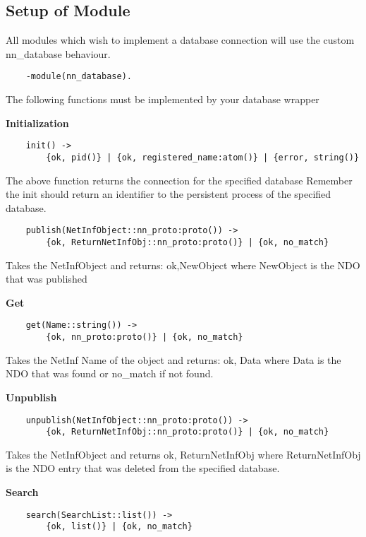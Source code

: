 \documentclass[11pt]{report}
\begin{document}
\subsection {Setup of Module}

All modules which wish to implement a database connection will use the custom nn\_database behaviour.

\begin {verbatim}
    -module(nn_database).
\end{verbatim}

The following functions must be implemented by your database wrapper

\textbf{Initialization}

\begin {verbatim}
    init() -> 
    	{ok, pid()} | {ok, registered_name:atom()} | {error, string()}
\end{verbatim}

The above function returns the connection for the specified database
Remember the init should return an identifier to the persistent process of the specified database.

\begin {verbatim}
    publish(NetInfObject::nn_proto:proto()) -> 
    	{ok, ReturnNetInfObj::nn_proto:proto()} | {ok, no_match}
\end{verbatim}

Takes the NetInfObject and returns: {ok,NewObject} where NewObject is the NDO that was published

\textbf{Get}

\begin {verbatim}
    get(Name::string()) -> 
    	{ok, nn_proto:proto()} | {ok, no_match}
\end{verbatim}

Takes the NetInf Name of the object and returns: {ok, Data} where Data is the NDO that was found or no\_match if not found.

\textbf{Unpublish}

\begin {verbatim}
    unpublish(NetInfObject::nn_proto:proto()) -> 
    	{ok, ReturnNetInfObj::nn_proto:proto()} | {ok, no_match}
\end{verbatim}

Takes the NetInfObject and returns {ok, ReturnNetInfObj} where ReturnNetInfObj is the NDO entry that was deleted from the specified database.

\textbf{Search}

\begin {verbatim}
    search(SearchList::list()) -> 
    	{ok, list()} | {ok, no_match}
\end{verbatim}
\end{document}

